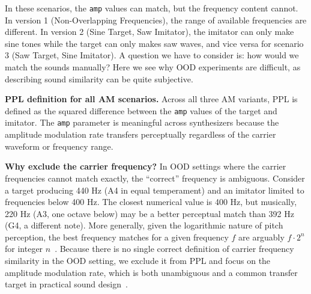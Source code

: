 \documentclass[10pt]{article} %
\newcommand{\todo}[1]{\textcolor{red}{#1}}
\begin{document}
In these scenarios, the \texttt{amp} values can match, but the frequency content cannot. In version 1 (Non-Overlapping Frequencies), the range of available frequencies are different. In version 2 (Sine Target, Saw Imitator), the imitator can only make sine tones while the target can only makes saw waves, and vice versa for scenario 3 (Saw Target, Sine Imitator). A question we have to consider is: how would we match the sounds manually? Here we see why OOD experiments are difficult, as describing sound similarity can be quite subjective.


\textbf{PPL definition for all AM scenarios.} Across all three AM variants, PPL is defined as the squared difference between the \texttt{amp} values of the target and imitator. The \texttt{amp}  parameter is meaningful across synthesizers because the amplitude modulation rate transfers perceptually regardless of the carrier waveform or frequency range. 

\textbf{Why exclude the carrier frequency?} In OOD settings where the carrier frequencies cannot match exactly, the ``correct'' frequency is ambiguous. Consider a target producing 440 Hz (A4 in equal temperament) and an imitator limited to frequencies below 400 Hz. The closest numerical value is 400 Hz, but musically, 220 Hz (A3, one octave below) may be a better perceptual match than 392 Hz (G4, a different note). More generally, given the logarithmic nature of pitch perception, the best frequency matches for a given frequency $f$ are arguably $f \cdot 2^n$ for integer $n$~\cite{young1939terminology,sethares2005tuning}. Because there is no single correct definition of carrier frequency similarity in the OOD setting, we exclude it from PPL and focus on the amplitude modulation rate, which is both unambiguous and a common transfer target in practical sound design~\cite{engel2020ddsp}.


\end{document}

